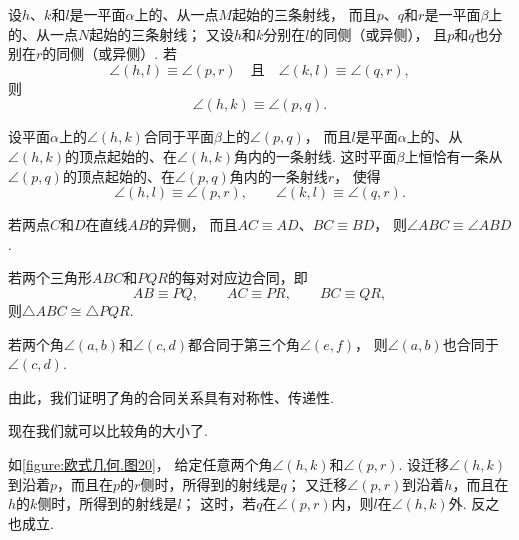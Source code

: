 \begin{theorem}\label{theorem:欧式几何.定理15}
设\(h\)、\(k\)和\(l\)是一平面\(\alpha\)上的、从一点\(M\)起始的三条射线，%
而且\(p\)、\(q\)和\(r\)是一平面\(\beta\)上的、从一点\(N\)起始的三条射线；%
又设\(h\)和\(k\)分别在\(l\)的同侧（或异侧），%
且\(p\)和\(q\)也分别在\(r\)的同侧（或异侧）.
若
\[
\angle(h,l) \equiv \angle(p,r)
\quad\text{且}\quad
\angle(k,l) \equiv \angle(q,r),
\]
则
\[
\angle(h,k) \equiv \angle(p,q).
\]
\end{theorem}

\begin{theorem}\label{theorem:欧式几何.定理16}
设平面\(\alpha\)上的\(\angle(h,k)\)合同于平面\(\beta\)上的\(\angle(p,q)\)，%
而且\(l\)是平面\(\alpha\)上的、从\(\angle(h,k)\)的顶点起始的、在\(\angle(h,k)\)角内的一条射线.
这时平面\(\beta\)上恒恰有一条从\(\angle(p,q)\)的顶点起始的、在\(\angle(p,q)\)角内的一条射线\(r\)，%
使得
\[
\angle(h,l) \equiv \angle(p,r), \qquad
\angle(k,l) \equiv \angle(q,r).
\]
\end{theorem}

\begin{theorem}\label{theorem:欧式几何.定理17}
若两点\(C\)和\(D\)在直线\(AB\)的异侧，%
而且\(AC \equiv AD\)、\(BC \equiv BD\)，%
则\(\angle ABC \equiv \angle ABD\).
\end{theorem}

\begin{theorem}[三角形的合同定理3]\label{theorem:欧式几何.定理18}
若两个三角形\(ABC\)和\(PQR\)的每对对应边合同，即
\[
AB \equiv PQ, \qquad
AC \equiv PR, \qquad
BC \equiv QR,
\]
则\(\triangle ABC \cong \triangle PQR\).
\end{theorem}

\begin{theorem}\label{theorem:欧式几何.定理19}
若两个角\(\angle(a,b)\)和\(\angle(c,d)\)都合同于第三个角\(\angle(e,f)\)，%
则\(\angle(a,b)\)也合同于\(\angle(c,d)\).
\end{theorem}
由此，我们证明了角的合同关系具有对称性、传递性.

现在我们就可以比较角的大小了.

\begin{theorem}\label{theorem:欧式几何.定理20}
如\cref{figure:欧式几何.图20}，
给定任意两个角\(\angle(h,k)\)和\(\angle(p,r)\).
设迁移\(\angle(h,k)\)到沿着\(p\)，而且在\(p\)的\(r\)侧时，所得到的射线是\(q\)；
又迁移\(\angle(p,r)\)到沿着\(h\)，而且在\(h\)的\(k\)侧时，所得到的射线是\(l\)；
这时，若\(q\)在\(\angle(p,r)\)内，则\(l\)在\(\angle(h,k)\)外.
反之也成立.
\end{theorem}


